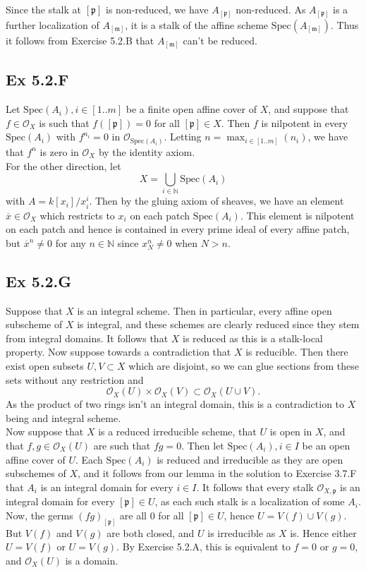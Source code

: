 \documentclass{article}
\theoremstyle{definition}
\newcommand{\N}{\mathbb{N}}
\newcommand{\oo}{\mathcal{O}}
\newcommand{\osp}[1]{\oo_{\Spec\left(#1\right)}}
\newcommand{\Spec}{\text{Spec}}
\begin{document}
Since the stalk at $[\mathfrak{p}]$ is non-reduced, we have
$A_{[\mathfrak{p}]}$ non-reduced. As $A_{[\mathfrak{p}]}$ is a further
localization of $A_{[\mathfrak{m}]}$, it is a stalk of the affine scheme
$\Spec(A_{[\mathfrak{m}]})$. Thus it follows from Exercise 5.2.B that
$A_{[\mathfrak{m}]}$ can't be reduced.

\subsection*{Ex 5.2.F}

Let $\Spec(A_i), i \in [1..m]$ be a finite open affine cover of $X$, and
suppose that $f \in \oo_{X}$ is such that $f([\mathfrak{p}]) = 0$ for all
$[\mathfrak{p}] \in X$. Then $f$ is nilpotent in every $\Spec(A_i)$ with
$f^{n_i} = 0$ in $\osp{A_i}$. Letting $n = \max_{i \in [1..m]}(n_i)$, we have
that $f^n$ is zero in $\oo_{X}$ by the identity axiom. \\

For the other direction, let
\[
	X
	=
	\bigcup_{i \in \N} \Spec(A_i)
\]
with $A = k[x_i]/x_i^i$. Then by the gluing axiom of sheaves, we have an
element $\overline{x} \in \oo_{X}$ which restricts to $x_i$ on each patch
$\Spec(A_i)$. This element is nilpotent on each patch and hence is contained in
every prime ideal of every affine patch, but $\overline{x}^n \not = 0$ for any
$n \in \N$ since $x_N^{n} \not = 0$ when $N > n$.

\subsection*{Ex 5.2.G}

Suppose that $X$ is an integral scheme. Then in particular, every affine open
subscheme of $X$ is integral, and these schemes are clearly reduced since they
stem from integral domains. It follows that $X$ is reduced as this is a
stalk-local property. Now suppose towards a contradiction that $X$ is
reducible. Then there exist open subsets $U, V \subset X$ which are disjoint,
so we can glue sections from these sets without any restriction and
\[
	\oo_{X}(U)
	\times
	\oo_{X}(V)
	\subset
	\oo_{X}(U \cup V).
\]
As the product of two rings isn't an integral domain, this is a contradiction
to $X$ being and integral scheme. \\

Now suppose that $X$ is a reduced irreducible scheme, that $U$ is open in $X$,
and that $f, g \in \mathcal{O}_X(U)$ are such that $fg = 0$. Then let
$\Spec(A_i), i \in I$ be an open affine cover of $U$. Each $\Spec(A_i)$ is
reduced and irreducible as they are open subschemes of $X$, and it follows from
our lemma in the solution to Exercise 3.7.F that $A_i$ is an integral domain
for every $i \in I$. It follows that every stalk $\mathcal{O}_{X,
	\mathfrak{p}}$ is an integral domain for every $[\mathfrak{p}] \in U$, as each
such stalk is a localization of some $A_i$. Now, the germs
$(fg)_{[\mathfrak{p}]}$ are all $0$ for all $[\mathfrak{p}] \in U$, hence $U =
	V(f) \cup V(g)$. But $V(f)$ and $V(g)$ are both closed, and $U$ is irreducible
as $X$ is. Hence either $U = V(f)$ or $U = V(g)$. By Exercise 5.2.A, this is
equivalent to $f = 0$ or $g = 0$, and $\mathcal{O}_X(U)$ is a domain.
\end{document}
